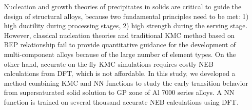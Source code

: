 \begin{comment}
\begingroup
\begin{figure}[!ht]
  \centering
  \subfigure[]{\texttt{[image: ]}}\label{Chap:Al/Vac:fig:}
  \subfigure[]{\texttt{[image: ]}}\label{Chap:Al/Vac:fig:}
\caption[]{}
  \label{Chap:Al/Vac:fig}
\end{figure}
\endgroup
\end{comment}

Nucleation and growth theories of precipitates in solids are critical to guide the design of structural alloys, because two fundamental principles need to be met: 1) high ductility during processing stages, 2) high strength during the serving stage. However, classical nucleation theories and traditional \ac{KMC} method based on \acf{BEP} relationship fail to provide quantitative guidance for the development of multi-component alloys because of the large number of element types. On the other hand, accurate on-the-fly \ac{KMC} simulations requires costly \ac{NEB} calculations from \ac{DFT}, which is not affordable. In this study, we developed a method combining \ac{KMC} and \ac{NN} functions to study the early transition behavior from supersaturated solid solution to \ac{GP} zone of Al 7000 series alloys. A \ac{NN} function is trained on several thousand accurate \ac{NEB} calculations using \ac{DFT}.





